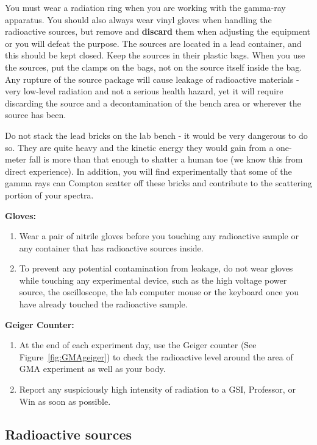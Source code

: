 \documentclass{../lab}
\begin{document}
You must wear a radiation ring when you are working with the gamma-ray apparatus. You should also always wear vinyl gloves when handling the radioactive sources, but remove and \textbf{discard} them when adjusting the equipment or you will defeat the purpose. The sources are located in a lead container, and this should be kept closed. Keep the sources in their plastic bags. When you use the sources, put the clamps on the bags, not on the source itself inside the bag. Any rupture of the source package will cause leakage of radioactive materials - very low-level radiation and not a serious health hazard, yet it will require discarding the source and a decontamination of the bench area or wherever the source has been.

Do not stack the lead bricks on the lab bench - it would be very dangerous to do so. They are quite heavy and the kinetic energy they would gain from a one-meter fall is more than that enough to shatter a human toe (we know this from direct experience). In addition, you will find experimentally that some of the gamma rays can Compton scatter off these bricks and contribute to the scattering portion of your spectra.


\textbf{Gloves:}
\begin{enumerate}
    \item Wear a pair of nitrile gloves before you touching any radioactive sample or any container that has radioactive sources inside.
    
    \item To prevent any potential contamination from leakage, do not wear gloves while touching any experimental device, such as the high voltage power source, the oscilloscope, the lab computer mouse or the keyboard once you have already touched the radioactive sample.
\end{enumerate}

\textbf{Geiger Counter:}
\begin{enumerate}
    \item At the end of each experiment day, use the Geiger counter (See Figure~\ref{fig:GMAgeiger}) to check the radioactive level around the area of GMA experiment as well as your body.
    
    \item Report any suspiciously high intensity of radiation to a GSI, Professor, or Win as soon as possible.
\end{enumerate}

\subsection{Radioactive sources}
\end{document}

